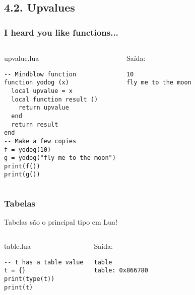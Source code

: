\documentclass[brazil]{beamer}
\begin{document}
\subsection{4.2. Upvalues}
\begin{frame}[fragile]
  \frametitle{I heard you like functions...}
  \pause
  \begin{columns}
      \begin{block}{upvalue.lua}
        \begin{lstlisting}
-- Mindblow function
function yodog (x)
  local upvalue = x
  local function result ()
    return upvalue
  end
  return result
end
-- Make a few copies
f = yodog(10)
g = yodog("fly me to the moon")
print(f())
print(g())
        \end{lstlisting}
      \end{block}
    \pause
      \begin{block}{Saída:}
        \begin{verbatim}
10
fly me to the moon \end{verbatim}
      \end{block}
  \end{columns}
\end{frame}

\begin{frame}[fragile]
  \frametitle{Tabelas}
  \pause
  \begin{center}
    Tabelas são o principal tipo em Lua!
  \end{center}
  \pause
  \begin{columns}
      \begin{block}{table.lua}
        \begin{lstlisting}
-- t has a table value
t = {}
print(type(t))
print(t)
        \end{lstlisting}
      \end{block}
    \pause
      \begin{block}{Saída:}
        \begin{verbatim}
table
table: 0x866780  \end{verbatim}
      \end{block}
  \end{columns}
\end{frame}
\end{document}
